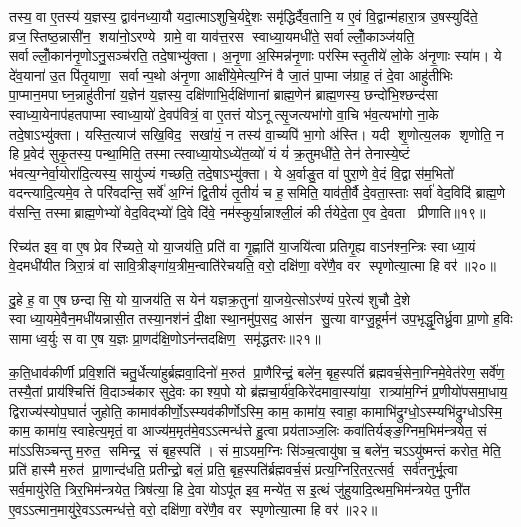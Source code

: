 तस्य॒ वा ए॒तस्य॑ य॒ज्ञस्य॒ द्वाव॑नध्या॒यौ यदा॒त्माऽशुचि॒र्यद्दे॒शः समृ॑द्धिर्दैव॒तानि॒ य ए॒वं वि॒द्वान्म॑हारा॒त्र उ॒षस्युदि॑ते॒ व्रज॒स्तिष्ठ॒न्नासी॑न॒ शया॑नो॒ऽरण्ये ग्रामे॒ वा याव॑त्त॒रस स्वाध्या॒यमधी॑ते॒ सर्वाल्लोँ॒काञ्ज॑यति॒ सर्वाल्लोँ॒कान॑नृ॒णोऽनु॒सञ्च॑रति॒ तदे॒षाभ्यु॑क्ता। अ॒नृ॒णा अ॒स्मिन्न॑नृ॒णाः पर॑स्मिस्तृ॒तीये॑ लो॒के अ॑नृ॒णाः स्या॑म। ये दे॑व॒याना॑ उ॒त पि॑तृ॒याणा॒ सर्वान्प॒थो अ॑नृ॒णा आक्षी॑ये॒मेत्य॒ग्निं वै जा॒तं पा॒प्मा ज॑ग्राह॒ तं दे॒वा आहु॑तीभिः पा॒प्मान॒मपाघ्न॒न्नाहु॑तीनां य॒ज्ञेन॑ य॒ज्ञस्य॒ दक्षि॑णाभि॒र्दक्षि॑णानां ब्राह्म॒णेन॑ ब्राह्म॒णस्य॒ छन्दो॑भि॒श्छन्द॑सा स्वाध्या॒येनाप॑हतपाप्मा स्वाध्या॒यो॑ दे॒वप॑वित्रं॒ वा ए॒तत्तं योऽनूत्सृ॒जत्यभा॑गो वा॒चि भ॑व॒त्यभा॑गो ना॒के तदे॒षाऽभ्यु॑क्ता। यस्ति॒त्याज॑ सखि॒विद॒ सखा॑यं॒ न तस्य॑ वा॒च्यपि॑ भा॒गो अ॑स्ति। यदी शृ॒णोत्य॒लक शृणोति॒ न हि प्र॒वेद॑ सुकृ॒तस्य॒ पन्था॒मिति॒ तस्मात्स्वाध्या॒योऽध्ये॑त॒व्यो॑ यं यं॑ क्र॒तुमधी॑ते॒ तेन॑ तेनास्ये॒ष्टं भ॑वत्य॒ग्नेर्वा॒योरा॑दि॒त्यस्य॒ सायु॑ज्यं गच्छति॒ तदे॒षाऽभ्यु॑क्ता। ये अ॒र्वाङु॒त वा॑ पुरा॒णे वे॒दं वि॒द्वास॑म॒भितो॑ वदन्त्यादि॒त्यमे॒व ते परि॑वदन्ति॒ सर्वे॑ अ॒ग्निं द्वि॒तीयं॑ तृ॒तीयं॑ च ह॒समिति॒ याव॑ती॒र्वै दे॒वता॒स्ताः सर्वा॑ वेद॒विदि॑ ब्राह्म॒णे व॑सन्ति॒ तस्माब्राह्म॒णेभ्यो॑ वेद॒विद्भ्यो॑ दि॒वे दि॑वे॒ नम॑स्कुर्या॒न्नाश्ली॒लं कीर्तयेदे॒ता ए॒व दे॒वता प्रीणाति॥१९॥
\anuvakamend

रिच्य॑त इव॒ वा ए॒ष प्रेव रि॑च्यते॒ यो या॒जय॑ति॒ प्रति॑ वा गृ॒ह्णाति॑ या॒जयि॑त्वा प्रतिगृ॒ह्य वाऽन॑श्न॒न्त्रिः स्वाध्या॒यं वे॒दमधी॑यीत त्रिरा॒त्रं वा॑ सावि॒त्रीङ्गा॑य॒त्रीम॒न्वाति॑रेचयति॒ वरो॒ दक्षि॑णा॒ वरे॑णै॒व वर स्पृणोत्या॒त्मा हि वर॑॥२०॥
\anuvakamend

दु॒हे ह॒ वा ए॒ष छन्दासि॒ यो या॒जय॑ति॒ स येन॑ यज्ञक्र॒तुना॑ या॒जये॒त्सोऽर॑ण्यं प॒रेत्य॑ शुचौ दे॒शे स्वाध्या॒यमे॒वैन॒मधी॑यन्नासी॒त तस्या॒नश॑नं दी॒क्षा स्था॒नमु॑प॒सद॒ आस॑न सु॒त्या वाग्जु॒हूर्मन॑ उप॒भृद्धृ॒तिर्ध्रु॒वा प्रा॒णो ह॒विः सामाध्व॒र्युः स वा ए॒ष य॒ज्ञः प्रा॒णद॑क्षि॒णोऽन॑न्तदक्षिण॒ समृ॑द्धतरः॥२१॥
\anuvakamend


क॒ति॒धाव॑कीर्णी प्रवि॒शति॑ चतु॒र्धेत्या॑हुर्ब्रह्मवा॒दिनो॑ म॒रुत॑ प्रा॒णैरिन्द्रं॒ बले॑न॒ बृह॒स्पतिं॑ ब्रह्मवर्च॒सेना॒ग्निमे॒वेत॑रेण॒ सर्वे॑ण॒ तस्यै॒तां प्राय॑श्चित्तिं वि॒दाञ्च॑कार सुदे॒वः काश्य॒पो यो ब्र॑ह्मचा॒र्य॑व॒किरे॑दमावा॒स्या॑या॒ रात्र्या॑म॒ग्निं प्र॒णीयो॑पसमा॒धाय॒ द्विराज्य॑स्योप॒घातं॑ जुहोति॒ कामाव॑कीर्णो॒ऽस्म्यव॑कीर्णोऽस्मि॒ काम॒ कामा॑य॒ स्वाहा॒ कामाभि॑द्रुग्धो॒ऽस्म्यभि॑द्रुग्धोऽस्मि॒ काम॒ कामा॑य॒ स्वाहेत्य॒मृतं॒ वा आज्य॑म॒मृत॑मे॒वऽऽत्मन्ध॑त्ते हु॒त्वा प्रय॑ताञ्ज॒लिः कवा॑तिर्यङ्ङ॒ग्निम॒भि\-म॑न्त्रयेत॒ सं मा॑ऽऽसिञ्चन्तु म॒रुत॒ समिन्द्र॒ सं बृह॒स्पति॑। सं मा॒ऽयम॒ग्निः सि॑ञ्च॒त्वायु॑षा च॒ बले॑न॒ चऽऽयु॑ष्मन्तं करोत॒ मेति॒ प्रति॑ हास्मै म॒रुत॑ प्रा॒णान्द॑धति॒ प्रतीन्द्रो॒ बलं॒ प्रति॒ बृह॒स्पति॑र्ब्रह्मवर्च॒सं प्रत्य॒ग्निरि॒तर॒त्सर्व॒ सर्व॑तनुर्भू॒त्वा सर्व॒मायु॑रेति॒ त्रिर॒भिम॑न्त्रयेत॒ त्रिष॑त्या॒ हि दे॒वा योऽपू॑त इव॒ मन्ये॑त॒ स इ॒त्थं जु॑हुयादि॒त्थम॒भिम॑न्त्रयेत॒ पुनी॑त ए॒वऽऽत्मान॒मायु॑रे॒वऽऽत्मन्ध॑त्ते॒ वरो॒ दक्षि॑णा॒ वरे॑णै॒व वर स्पृणोत्या॒त्मा हि वर॑॥२२॥
\anuvakamend

